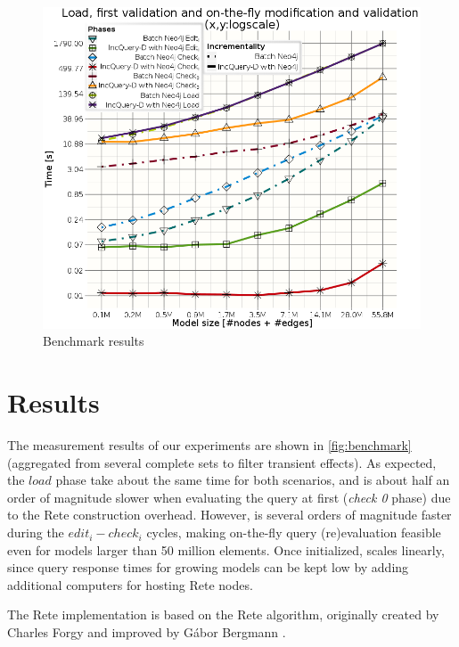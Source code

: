 \begin{figure}
\begin{center}
\includegraphics[width=\columnwidth]{figures/All_RouteSensor}
\caption{Benchmark results}
\label{fig:benchmark}
\end{center}
\end{figure}

\section{Results}
\label{benchmark_results}\label{analysis}

The measurement results of our experiments are shown in \autoref{fig:benchmark} (aggregated from several complete sets to filter transient effects). As expected, the $load$ phase take about the same time for both scenarios, and \incqueryD{} is about half an order of magnitude slower when evaluating the query at first (\textit{check 0} phase) due to the Rete construction overhead. However, \incqueryD{} is several orders of magnitude faster during the $edit_i - check_i$ cycles, making on-the-fly query (re)evaluation feasible even for models larger than 50 million elements. Once initialized, \incqueryD{} scales linearly, since query response times for growing models can be kept low by adding additional computers for hosting Rete nodes.

The Rete implementation is based on the Rete algorithm, originally created by Charles Forgy \cite{Forgy} and improved by Gábor Bergmann \cite{BergmannRete}.

